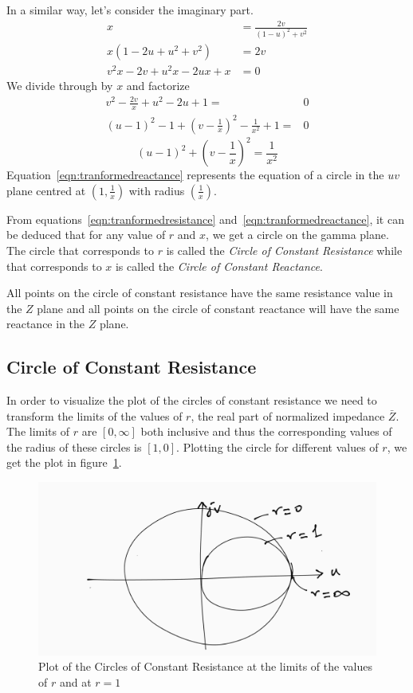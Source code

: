 In a similar way, let's consider the imaginary part.
\begin{align*}
x &= \frac{2v}{{(1 - u)}^2 + v^2}\\
x(1 - 2u + u^2 + v^2) &= 2v\\
v^2x - 2v + u^2x - 2ux + x &= 0
\end{align*}
We divide through by $x$ and factorize
\begin{align*}
v^2 - \frac{2v}{x} +u^2 - 2u + 1 =& 0\\
{(u - 1)}^2 -1 + {\left(v - \frac{1}{x}\right)}^2 -\frac{1}{x^2} + 1 =& 0
\end{align*}
\begin{equation}
{(u - 1)}^2 + {\left(v - \frac{1}{x}\right)}^2 = \frac{1}{x^2}\label{eqn:tranformedreactance}
\end{equation}
Equation~\eqref{eqn:tranformedreactance} represents the equation of a circle in the $uv$ plane centred at $\left(1,\frac{1}{x}\right)$ with radius $\left(\frac{1}{x}\right)$.

From equations~\eqref{eqn:tranformedresistance} and~\eqref{eqn:tranformedreactance}, it can be deduced that for any value of $r$ and $x$, we get a circle on the gamma plane. The circle that corresponds to $r$ is called the \emph{Circle of Constant Resistance} while that corresponds to $x$ is called the \emph{Circle of Constant Reactance}.

All points on the circle of constant resistance have the same resistance value in the $Z$ plane and all points on the circle of constant reactance will have the same reactance in the $Z$ plane.

\subsection{Circle of Constant Resistance}
In order to visualize the plot of the circles of constant resistance we need to transform the limits of the values of $r$, the real part of normalized impedance $\bar{Z}$. The limits of $r$ are $[0, \infty]$ both inclusive and thus the corresponding values of the radius of these circles is $[1, 0]$. Plotting the circle for different values of $r$, we get the plot in figure~\ref{fig:ouytre}.
\begin{figure}[h]
\centering
\includegraphics[width=1\linewidth]{./graphics/circle_of_constant_resistance_temp.png}
\caption{Plot of the Circles of Constant Resistance at the limits of the values of $r$ and at $r = 1$}
\label{fig:ouytre}
\end{figure}

